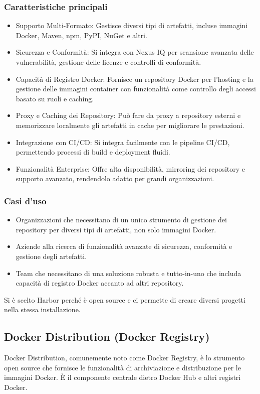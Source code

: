 \documentclass[12pt]{report}
\begin{document}
\subsubsection{Caratteristiche principali}
\begin{itemize}
  \item Supporto Multi-Formato: Gestisce diversi tipi di artefatti, incluse immagini Docker, Maven, npm, PyPI, NuGet e altri.
  \item Sicurezza e Conformità: Si integra con Nexus IQ per scansione avanzata delle vulnerabilità, gestione delle licenze e controlli di conformità.
  \item Capacità di Registro Docker: Fornisce un repository Docker per l'hosting e la gestione delle immagini container con funzionalità come controllo degli accessi basato su ruoli e caching.
  \item Proxy e Caching dei Repository: Può fare da proxy a repository esterni e memorizzare localmente gli artefatti in cache per migliorare le prestazioni.
  \item Integrazione con CI/CD: Si integra facilmente con le pipeline CI/CD, permettendo processi di build e deployment fluidi.
  \item Funzionalità Enterprise: Offre alta disponibilità, mirroring dei repository e supporto avanzato, rendendolo adatto per grandi organizzazioni.\cite{nexus}
\end{itemize}
\subsubsection{Casi d'uso}
\begin{itemize}
  \item Organizzazioni che necessitano di un unico strumento di gestione dei repository per diversi tipi di artefatti, non solo immagini Docker.
  \item Aziende alla ricerca di funzionalità avanzate di sicurezza, conformità e gestione degli artefatti.
  \item Team che necessitano di una soluzione robusta e tutto-in-uno che includa capacità di registro Docker accanto ad altri repository.
\end{itemize}

Si è scelto Harbor perché è open source e ci permette di creare diversi progetti nella stessa installazione.

\subsection{Docker Distribution (Docker Registry)}
Docker Distribution, comunemente noto come Docker Registry, è lo strumento open source che fornisce le funzionalità di archiviazione e distribuzione per le immagini Docker. È il componente centrale dietro Docker Hub e altri registri Docker. \cite{distribution}
\end{document}
